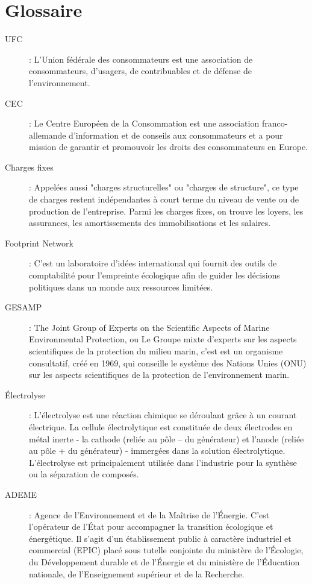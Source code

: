 \chapter{Glossaire}

\begin{description}

\item[UFC] : L'Union fédérale des consommateurs est une association de consommateurs, d'usagers, de contribuables et de défense de l'environnement.

\item[CEC] : Le Centre Européen de la Consommation est une association franco-allemande d’information et de conseils aux consommateurs et a pour mission de garantir et promouvoir les droits des consommateurs en Europe.

\item[Charges fixes] : Appelées aussi "charges structurelles" ou "charges de structure", ce type de charges restent indépendantes à court terme du niveau de vente ou de production de l’entreprise. Parmi les charges fixes, on trouve les loyers, les assurances, les amortissements des immobilisations et les salaires.

\item[Footprint Network] : C'est un laboratoire d’idées international qui fournit des outils de comptabilité pour l'empreinte écologique afin de guider les décisions politiques dans un monde aux ressources limitées.

\item[GESAMP] : The Joint Group of Experts on the Scientific Aspects of Marine Environmental Protection, ou Le Groupe mixte d'experts sur les aspects scientifiques de la protection du milieu marin, c'est est un organisme consultatif, créé en 1969, qui conseille le système des Nations Unies (ONU) sur les aspects scientifiques de la protection de l'environnement marin.

\item[Électrolyse] : L’électrolyse est une réaction chimique se déroulant grâce à un courant électrique. La cellule électrolytique est constituée de deux électrodes en métal inerte - la cathode (reliée au pôle – du générateur) et l'anode (reliée au pôle + du générateur) - immergées dans la solution électrolytique. L'électrolyse est principalement utilisée dans l'industrie pour la synthèse ou la séparation 
de composés.

\item[ADEME] : Agence de l’Environnement et de la Maîtrise de l’Énergie. C'est l'opérateur de l'État pour accompagner la transition écologique et énergétique. Il s'agit d'un établissement public à caractère industriel et commercial (EPIC) placé sous tutelle conjointe du ministère de l’Écologie, du Développement durable et de l’Énergie et du ministère de l’Éducation nationale, de l’Enseignement supérieur et de la Recherche.


\end{description}
